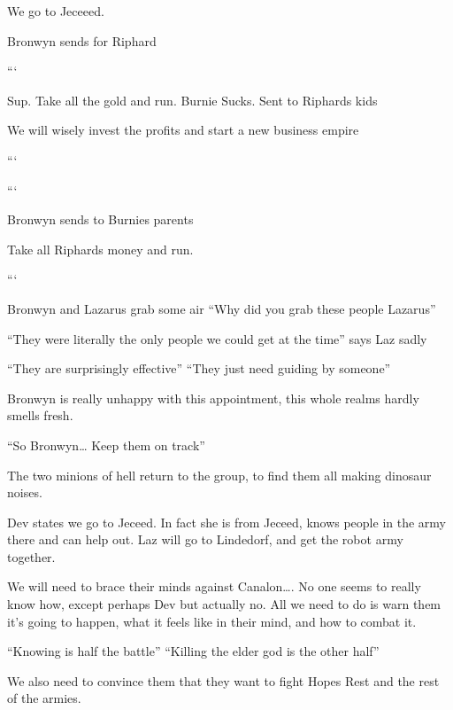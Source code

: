 We go to Jeceeed.\medskip

Bronwyn sends for Riphard\medskip

```\medskip

Sup. Take all the gold and run. Burnie Sucks. Sent to Riphards kids\medskip

We will wisely invest the profits and start a new business empire\medskip

```\medskip

```\medskip

Bronwyn sends to Burnies parents\medskip

Take all Riphards money and run.\medskip

```\medskip

Bronwyn and Lazarus grab some air “Why did you grab these people Lazarus”\medskip

“They were literally the only people we could get at the time” says Laz sadly\medskip

“They are surprisingly effective” “They just need guiding by someone”\medskip

Bronwyn is really unhappy with this appointment, this whole realms hardly smells fresh.\medskip

“So Bronwyn… Keep them on track”\medskip

The two minions of hell return to the group, to find them all making dinosaur noises.\medskip

Dev states we go to Jeceed. In fact she is from Jeceed, knows people in the army there and can help out. Laz will go to Lindedorf, and get the robot army together.\medskip

We will need to brace their minds against Canalon…. No one seems to really know how, except perhaps Dev but actually no. All we need to do is warn them it's going to happen, what it feels like in their mind, and how to combat it.\medskip

“Knowing is half the battle” “Killing the elder god is the other half”\medskip

We also need to convince them that they want to fight Hopes Rest and the rest of the armies.\medskip

\vspace*{5mm}
